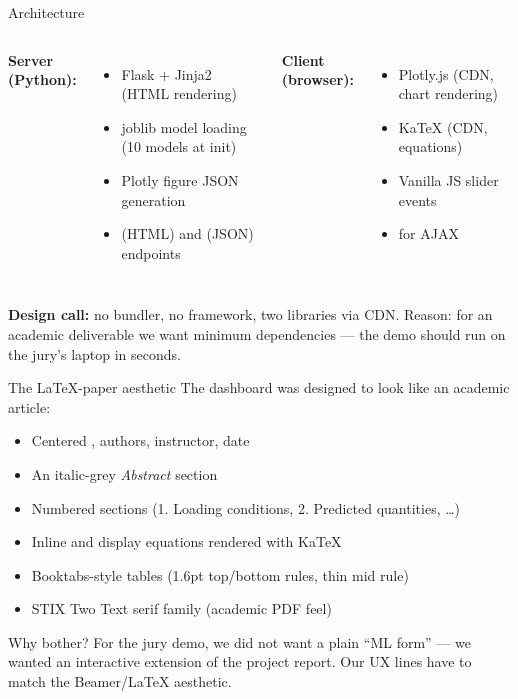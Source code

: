 \begin{frame}{Architecture}
  \begin{columns}[T,onlytextwidth]
    \textbf{Server (Python):}
    \begin{itemize}\small
      \item Flask + Jinja2 (HTML rendering)
      \item joblib model loading (10 models at init)
      \item Plotly figure JSON generation
      \item \code{/} (HTML) and  (JSON) endpoints
    \end{itemize}
    \textbf{Client (browser):}
    \begin{itemize}\small
      \item Plotly.js (CDN, chart rendering)
      \item KaTeX (CDN, equations)
      \item Vanilla JS slider events
      \item {} for AJAX
    \end{itemize}
  \end{columns}

  \vspace{0.5cm}
  \textbf{Design call:} no bundler, no framework, two libraries via CDN.
  Reason: for an academic deliverable we want \alert{minimum dependencies}
  --- the demo should run on the jury's laptop in seconds.
\end{frame}

\begin{frame}{The LaTeX-paper aesthetic}
  The dashboard was designed to look like an academic article:
  \begin{itemize}\small
    \item Centered , authors, instructor, date
    \item An italic-grey \emph{Abstract} section
    \item Numbered sections (1. Loading conditions, 2. Predicted quantities, \ldots)
    \item Inline and display equations rendered with KaTeX
    \item Booktabs-style tables (1.6pt top/bottom rules, thin mid rule)
    \item STIX Two Text serif family (academic PDF feel)
  \end{itemize}

  \vspace{0.4cm}
  \begin{block}{Why bother?}
    \footnotesize
    For the jury demo, we did not want a plain ``ML form'' --- we wanted an
    \alert{interactive extension of the project report}. Our UX lines have
    to match the Beamer/LaTeX aesthetic.
  \end{block}
\end{frame}

